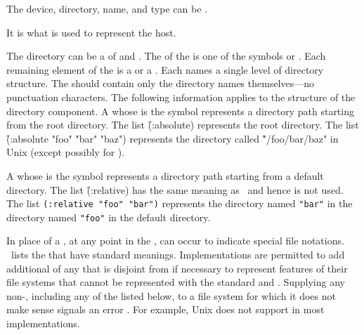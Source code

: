 \itemitem{\bull}
The device, directory, name, and type can be .
  
\itemitem{\bull}
It is  what 
is used to represent the host. 
  
\itemitem{\bull}
The directory can be a  of  and . 
The  of the  is one of the symbols  or 
. Each remaining element of the  is a  
or a .  Each  names a single level of directory 
structure.  The  should contain only the directory names 
themselves---no punctuation characters.
The following information applies to the structure of the directory component.
\beginlist
\itemitem{--}
  A  whose  is the symbol  represents 
  a directory path starting from the root directory.  The list 
  \f{(:absolute)} represents the root directory.  The list 
  \f{(:absolute "foo" "bar" "baz")} represents the directory called
  \f{"/foo/bar/baz"} in Unix (except possibly for ).
 
\itemitem{--}
  A  whose  is the symbol  represents 
  a directory path starting from a default directory.  
  The list \f{(:relative)} has the same meaning as \nil\ and hence is not used.
  The list {\tt (:relative "foo" "bar")} represents the directory named {\tt "bar"} 
  in the directory named {\tt "foo"} in the default directory.
 
\itemitem{--}
  In place of a , at any point in the ,  
  can occur to indicate special file notations.  \Thenextfigure\ lists
  the  that have standard meanings.  Implementations are 
  permitted to add additional  of any  
  that is disjoint from 
  if necessary to represent features of their file systems that cannot be
  represented with the standard  and .
  Supplying any non-, including any of the  listed below, 
  to a file system for which it does not make sense
  signals an error .
  For example, Unix does not support  in most implementations.
 
